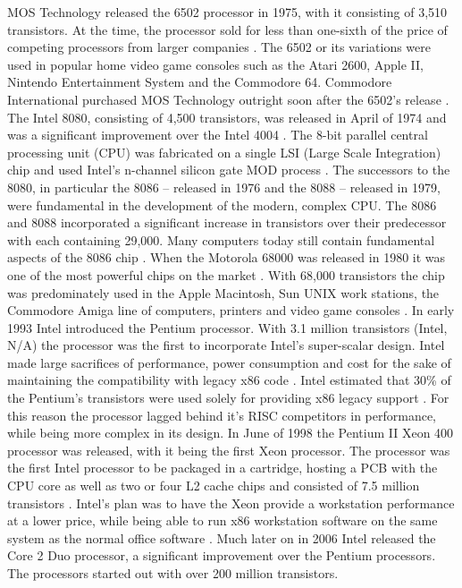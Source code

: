 MOS Technology released the 6502 processor in 1975, with it consisting of 3,510 transistors. At the time, the processor sold for less than one-sixth of the price of competing processors from larger companies \cite{RN29}. The 6502 or its variations were used in popular home video game consoles such as the Atari 2600, Apple II, Nintendo Entertainment System and the Commodore 64. Commodore International purchased MOS Technology outright soon after the 6502’s release \cite{RN29}.
The Intel 8080, consisting of 4,500 transistors, was released in April of 1974 and was a significant improvement over the Intel 4004 \cite{RN8}. The 8-bit parallel central processing unit (CPU) was fabricated on a single LSI (Large Scale Integration) chip and used Intel’s n-channel silicon gate MOD process \cite{RN10}. The successors to the 8080, in particular the 8086 – released in 1976 and the 8088 – released in 1979, were fundamental in the development of the modern, complex CPU. The 8086 and 8088 incorporated a significant increase in transistors over their predecessor with each containing 29,000. Many computers today still contain fundamental aspects of the 8086 chip \cite{RN11}.  
When the Motorola 68000 was released in 1980 it was one of the most powerful chips on the market \cite{RN18}. With 68,000 transistors the chip was predominately used in the Apple Macintosh, Sun UNIX work stations, the Commodore Amiga line of computers, printers and video game consoles \cite{RN18}. 
In early 1993 Intel introduced the Pentium processor. With 3.1 million transistors  (Intel, N/A) the processor was the first to incorporate Intel’s super-scalar design. Intel made large sacrifices of performance, power consumption and cost for the sake of maintaining the compatibility with legacy x86 code \cite{RN13}. Intel estimated that 30\% of the Pentium’s transistors were used solely for providing x86 legacy support \cite{RN7}. For this reason the processor lagged behind it’s RISC competitors in performance, while being more complex in its design.
In June of 1998 the Pentium II Xeon 400 processor was released, with it being the first Xeon processor. The processor was the first Intel processor to be packaged in a cartridge, hosting a PCB with the CPU core as well as two or four L2 cache chips \cite{RN12} and consisted of 7.5 million transistors \cite{RN19}. Intel’s plan was to have the Xeon provide a workstation performance at a lower price, while being able to run x86 workstation software on the same system as the normal office software \cite{RN12}.
Much later on in 2006 Intel released the Core 2 Duo processor, a significant improvement over the Pentium processors. The processors started out with over 200 million transistors. 
